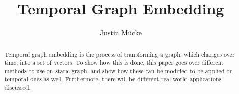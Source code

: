 \documentclass[sigconf]{acmart}
\begin{document}
\title{Temporal Graph Embedding}

\author{Justin Mücke}



\renewcommand{\shortauthors}{Justin Mücke}

\begin{abstract}
 Temporal graph embedding is the process of transforming a graph, which changes over time, into a set of vectors. 
 To show how this is done, this paper goes over different methods to use on static graph, and show how these can be modified to be applied on temporal ones as well. 
 Furthermore, there will be different real world applications discussed.
\end{abstract}





\maketitle
\end{document}
